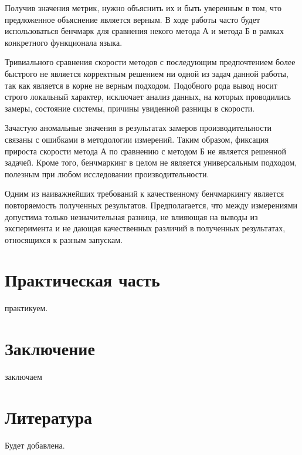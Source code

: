 \documentclass{mipt-thesis-bs}
\begin{document}
\begin{enumerate}
Получив значения метрик, нужно объяснить их и быть уверенным в том, что предложенное
объяснение является верным. В ходе работы часто будет использоваться бенчмарк для
сравнения некого метода А и метода Б в рамках конкретного функционала языка.

Тривиального сравнения скорости методов с последующим предпочтением более быстрого не является
корректным решением ни одной из задач данной работы, так как является в корне не верным подходом.
Подобного рода вывод носит строго локальный характер, исключает анализ данных, на которых
проводились замеры, состояние системы, причины увиденной разницы в скорости.

Зачастую аномальные значения в результатах замеров производительности связаны с
ошибками в методологии измерений. Таким образом, фиксация прироста скорости метода А по сравнению
с методом Б не является решенной задачей. Кроме того, бенчмаркинг в целом не является
универсальным подходом, полезным при любом исследовании производительности.

Одним из наиважнейших требований к качественному бенчмаркингу является повторяемость
полученных результатов. Предполагается, что между измерениями допустима только незначительная
разница, не влияющая на выводы из эксперимента и не дающая качественных различий в полученных
результатах, относящихся к разным запускам.
\end{enumerate}

\chapter{Практическая часть}
практикуем.

\chapter{Заключение}
заключаем

\backmatter


\chapter{Литература}

Будет добавлена.
\end{document}
